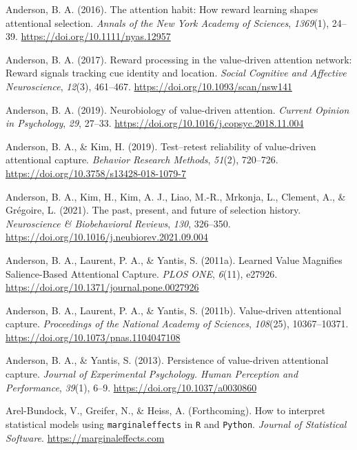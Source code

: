 \documentclass[
  man,
  floatsintext,
  longtable,
  nolmodern,
  notxfonts,
  notimes,
  mask,
  colorlinks=true,linkcolor=blue,citecolor=blue,urlcolor=blue]{apa7}
\newlength{\cslhangindent}
\newenvironment{CSLReferences}[2] %
 {\begin{list}{}{%
  \setlength{\itemindent}{0pt}
  \setlength{\leftmargin}{0pt}
  \setlength{\parsep}{0pt}
  \ifodd #1
   \setlength{\leftmargin}{\cslhangindent}
   \setlength{\itemindent}{-1\cslhangindent}
  \fi
  \setlength{\itemsep}{#2\baselineskip}}}
 {\end{list}}
\begin{document}
\begin{CSLReferences}{1}{0}
Anderson, B. A. (2016). The attention habit: How reward learning shapes
attentional selection. \emph{Annals of the New York Academy of
Sciences}, \emph{1369}(1), 24--39.
\url{https://doi.org/10.1111/nyas.12957}

Anderson, B. A. (2017). Reward processing in the value-driven attention
network: Reward signals tracking cue identity and location. \emph{Social
Cognitive and Affective Neuroscience}, \emph{12}(3), 461--467.
\url{https://doi.org/10.1093/scan/nsw141}

Anderson, B. A. (2019). Neurobiology of value-driven attention.
\emph{Current Opinion in Psychology}, \emph{29}, 27--33.
\url{https://doi.org/10.1016/j.copsyc.2018.11.004}

Anderson, B. A., \& Kim, H. (2019). Test--retest reliability of
value-driven attentional capture. \emph{Behavior Research Methods},
\emph{51}(2), 720--726. \url{https://doi.org/10.3758/s13428-018-1079-7}

Anderson, B. A., Kim, H., Kim, A. J., Liao, M.-R., Mrkonja, L., Clement,
A., \& Grégoire, L. (2021). The past, present, and future of selection
history. \emph{Neuroscience \& Biobehavioral Reviews}, \emph{130},
326--350. \url{https://doi.org/10.1016/j.neubiorev.2021.09.004}

Anderson, B. A., Laurent, P. A., \& Yantis, S. (2011a). Learned {Value
Magnifies Salience-Based Attentional Capture}. \emph{PLOS ONE},
\emph{6}(11), e27926. \url{https://doi.org/10.1371/journal.pone.0027926}

Anderson, B. A., Laurent, P. A., \& Yantis, S. (2011b). Value-driven
attentional capture. \emph{Proceedings of the National Academy of
Sciences}, \emph{108}(25), 10367--10371.
\url{https://doi.org/10.1073/pnas.1104047108}

Anderson, B. A., \& Yantis, S. (2013). Persistence of value-driven
attentional capture. \emph{Journal of Experimental Psychology. Human
Perception and Performance}, \emph{39}(1), 6--9.
\url{https://doi.org/10.1037/a0030860}

Arel-Bundock, V., Greifer, N., \& Heiss, A. (Forthcoming). How to
interpret statistical models using \texttt{marginaleffects} in
\texttt{R} and \texttt{Python}. \emph{Journal of Statistical Software}.
\url{https://marginaleffects.com}


\end{CSLReferences}
\end{document}
